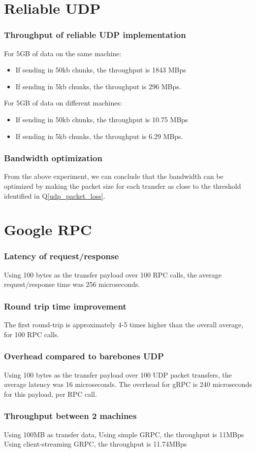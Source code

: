\documentclass[a4paper]{article}
\begin{document}
\part{Reliable UDP}

\section{Throughput of reliable UDP implementation}
For 5GB of data on the same machine:
\begin{itemize}
	\item If sending in 50kb chunks, the throughput is 1843 MBps
	\item If sending in 5kb chunks, the throughput is 296 MBps.
\end{itemize}
For 5GB of data on different machines:
\begin{itemize}
	\item If sending in 50kb chunks, the throughput is 10.75 MBps
	\item If sending in 5kb chunks, the throughput is 6.29 MBps.
\end{itemize}

\section{Bandwidth optimization}
From the above experiment, we can conclude that the bandwidth can be optimized by making the packet size for each transfer as close to the threshold identified in Q\ref{udp_packet_loss}.

\part{Google RPC}

\section{Latency of request/response}
Using 100 bytes as the transfer payload over 100 RPC calls, the average request/response time was 256 microseconds.

\section{Round trip time improvement}
The first round-trip is approximately 4-5 times higher than the overall average, for 100 RPC calls.

\section{Overhead compared to barebones UDP}
Using 100 bytes as the transfer payload over 100 UDP packet transfers, the average latency was 16 microseconds. 
The overhead for gRPC is 240 microseconds for this payload, per RPC call.

\section{Throughput between 2 machines}
Using 100MB as transfer data,
Using simple GRPC, the throughput is 11MBps
Using client-streaming GRPC, the throughput is 11.74MBps
\end{document}
